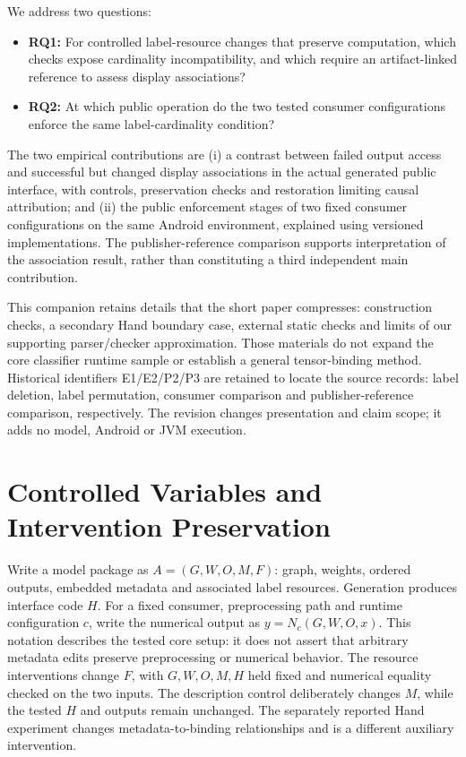 \documentclass[10pt,conference]{IEEEtran}
\begin{document}
We address two questions:
\begin{itemize}
\item \textbf{RQ1:} For controlled label-resource changes that preserve computation, which checks expose cardinality incompatibility, and which require an artifact-linked reference to assess display associations?
\item \textbf{RQ2:} At which public operation do the two tested consumer configurations enforce the same label-cardinality condition?
\end{itemize}
The two empirical contributions are (i) a contrast between failed output access and successful but changed display associations in the actual generated public interface, with controls, preservation checks and restoration limiting causal attribution; and (ii) the public enforcement stages of two fixed consumer configurations on the same Android environment, explained using versioned implementations. The publisher-reference comparison supports interpretation of the association result, rather than constituting a third independent main contribution.

This companion retains details that the short paper compresses: construction checks, a secondary Hand boundary case, external static checks and limits of our supporting parser/checker approximation. Those materials do not expand the core classifier runtime sample or establish a general tensor-binding method. Historical identifiers E1/E2/P2/P3 are retained to locate the source records: label deletion, label permutation, consumer comparison and publisher-reference comparison, respectively. The revision changes presentation and claim scope; it adds no model, Android or JVM execution.

\section{Controlled Variables and Intervention Preservation}
\label{sec:contracts}
Write a model package as $A=(G,W,O,M,F)$: graph, weights, ordered outputs, embedded metadata and associated label resources. Generation produces interface code $H$. For a fixed consumer, preprocessing path and runtime configuration $c$, write the numerical output as $y=N_c(G,W,O,x)$. This notation describes the tested core setup: it does not assert that arbitrary metadata edits preserve preprocessing or numerical behavior. The resource interventions change $F$, with $G,W,O,M,H$ held fixed and numerical equality checked on the two inputs. The description control deliberately changes $M$, while the tested $H$ and outputs remain unchanged. The separately reported Hand experiment changes metadata-to-binding relationships and is a different auxiliary intervention.
\end{document}
